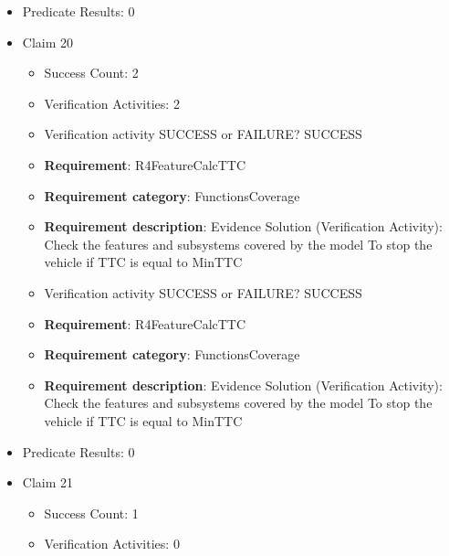 \documentclass{article}
\begin{document}
\begin{itemize}
\begin{itemize}
					\item Verification activity SUCCESS or FAILURE? SUCCESS
		
						\item \textbf{Requirement}: R3FeatureControlPedal 
						\item \textbf{Requirement category}: FunctionsCoverage 
						\item \textbf{Requirement description}: Evidence Solution (Verification Activity): Check the features and subsystems covered by the model  To prevent collision when obstacle is detected
					
				\end{itemize}
				
									    
				\item Predicate Results: 0

  				  \item Claim 20
				\begin{itemize}
			    	\item Success Count: 2 
			    	\item Verification Activities: 2
					\item Verification activity SUCCESS or FAILURE? SUCCESS
		
						\item \textbf{Requirement}: R4FeatureCalcTTC 
						\item \textbf{Requirement category}: FunctionsCoverage 
						\item \textbf{Requirement description}: Evidence Solution (Verification Activity): Check the features and subsystems covered by the model  To stop the vehicle if TTC is equal to MinTTC
					
					\item Verification activity SUCCESS or FAILURE? SUCCESS
		
						\item \textbf{Requirement}: R4FeatureCalcTTC 
						\item \textbf{Requirement category}: FunctionsCoverage 
						\item \textbf{Requirement description}: Evidence Solution (Verification Activity): Check the features and subsystems covered by the model  To stop the vehicle if TTC is equal to MinTTC
					
				\end{itemize}
				
									    
				\item Predicate Results: 0

  				  \item Claim 21
				\begin{itemize}
			    	\item Success Count: 1 
			    	\item Verification Activities: 0
				\end{itemize}
				

\end{itemize}
\end{document}

